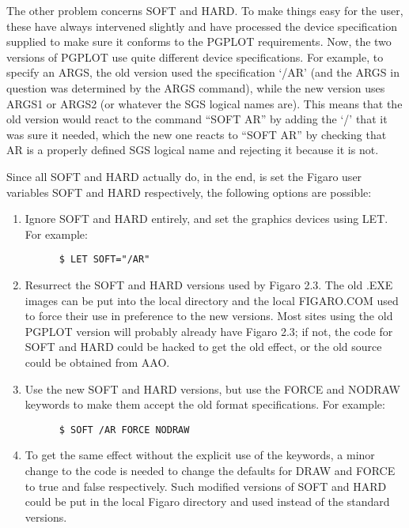 The other problem concerns SOFT and HARD. To make things easy for the user,
these have always intervened slightly and have processed the device
specification supplied to make sure it conforms to the PGPLOT  requirements. 
Now, the two versions of PGPLOT use quite different device specifications. For
example, to specify an ARGS, the old version used the specification `/AR' (and
the ARGS in question was determined by the ARGS command), while the new version
uses ARGS1 or ARGS2 (or whatever the SGS logical names are). This means that
the old version would react to the command ``SOFT AR'' by adding the `/' that 
it  was sure it needed, which the new one reacts to ``SOFT AR'' by checking
that AR is a properly defined SGS logical name and  rejecting it because it is
not.

Since all SOFT and HARD actually do, in the end, is set the Figaro user 
variables SOFT and HARD respectively, the following options are possible:

\begin{enumerate}

\item Ignore SOFT and HARD entirely, and set the graphics devices using LET. 
For example:

\begin{verbatim}
      $ LET SOFT="/AR"
\end{verbatim}

\item Resurrect the SOFT and HARD versions used by Figaro 2.3. The old .EXE 
images can be put into the local directory and the local FIGARO.COM used to
force their use in preference to the new  versions. Most sites using the old
PGPLOT version will probably already have Figaro 2.3; if not, the code  for 
SOFT and HARD could be hacked to get the old effect, or the old source could be
obtained from AAO.


\item Use the new SOFT and HARD versions, but use the FORCE and NODRAW  
keywords to make them accept the old format specifications. For example:

\begin{verbatim}
      $ SOFT /AR FORCE NODRAW
\end{verbatim}

\item To get the same effect without the explicit use of the keywords,  a minor
change to the code is needed to change the defaults for DRAW and FORCE to true
and false respectively. Such modified versions of SOFT and HARD could be put in
the local Figaro directory and used instead of the  standard versions.

\end{enumerate}

